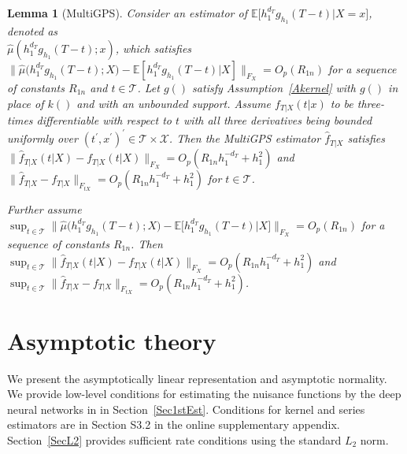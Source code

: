 \documentclass[lettersize, 12pt]{article}
\newtheorem{lemma}{Lemma}
\begin{document}

\begin{lemma}[MultiGPS]
Consider an estimator of $\mathbb{E}\big[h_1^{d_T}g_{h_1}(T-t)\big|X=x\big]$, denoted as \\
$\hat\mu(h_1^{d_T}g_{h_1}(T-t); x)$, which satisfies 
$\big\| \hat\mu\big(h_1^{d_T}g_{h_1}(T-t); X\big) - {\mathbb{E}}[h_1^{d_T}g_{h_1}(T-t)|X] \big\|_{F_X} = O_p(R_{1n})$
for a sequence of constants $R_{1n}$ and $t\in\mathcal{T}$.
Let $g()$ satisfy Assumption~\ref{Akernel} with $g()$ in place of $k()$ and with an unbounded support.
Assume $f_{T|X}(t|x)$ to be three-times differentiable with respect to $t$ with all three derivatives being bounded uniformly over $(t^\prime,x^\prime)^\prime\in\mathcal{T}\times\mathcal{X}$.
Then the MultiGPS estimator $\hat f_{T|X}$ satisfies 
$\big\| \hat f_{T|X}(t|X) - f_{T|X}(t|X)\big\|_{F_X} = O_p(R_{1n} h_1^{-d_T} + h_1^2)$  
and 
$\big\| \hat f_{T|X} - f_{T|X}\big\|_{F_{tX}} 
= O_p(R_{1n} h_1^{-d_T} + h_1^2)$ for $t\in\mathcal{T}$.  

Further assume $\sup_{t\in\mathcal{T}}\big\| \hat\mu\big(h_1^{d_T}g_{h_1}(T-t); X\big) - {\mathbb{E}}\big[h_1^{d_T}g_{h_1}(T-t)\big|X\big] \big\|_{F_X} = O_p(R_{1n})$ for a sequence of constants $R_{1n}$.
Then 
$\sup_{t\in\mathcal{T}} \big\| \hat f_{T|X}(t|X) - f_{T|X}(t|X)\big\|_{F_X} = O_p(R_{1n} h_1^{-d_T} + h_1^2)$  
and 
$\sup_{t\in\mathcal{T}} \big\| \hat f_{T|X} - f_{T|X}\big\|_{F_{tX}} 
= O_p(R_{1n} h_1^{-d_T} + h_1^2)$.  
\label{LGPSmulti}
\end{lemma}


\section{Asymptotic theory}
\label{SecAsy}
We present the asymptotically linear representation and asymptotic normality.
We provide low-level conditions for estimating the nuisance functions by the deep neural networks in \cite{Farrell18} in Section~\ref{Sec1stEst}. 
Conditions for kernel and series estimators are in Section S3.2 in the online supplementary appendix. 
Section~\ref{SecL2} provides sufficient rate conditions using the standard $L_2$ norm.
\end{document}
